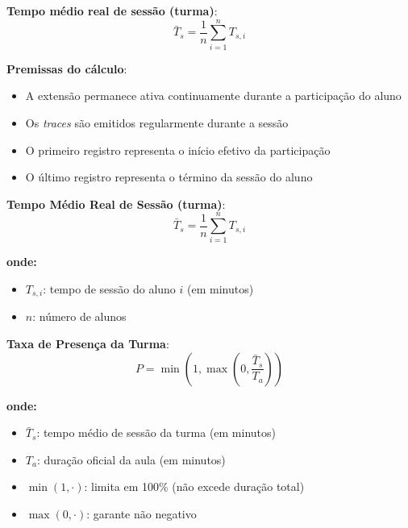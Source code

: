 \textbf{Tempo médio real de sessão (turma)}:
\begin{equation}
\bar{T}_s = \frac{1}{n} \sum_{i=1}^{n} T_{s,i}
\end{equation}

\textbf{Premissas do cálculo}:
\begin{itemize}
    \item A extensão permanece ativa continuamente durante a participação do aluno
    \item Os \textit{traces} são emitidos regularmente durante a sessão
    \item O primeiro registro representa o início efetivo da participação
    \item O último registro representa o término da sessão do aluno
\end{itemize}


\textbf{Tempo Médio Real de Sessão (turma)}:
\begin{equation}
\bar{T}_s = \frac{1}{n} \sum_{i=1}^{n} T_{s,i}
\end{equation}

\textbf{onde:}
\begin{itemize}
    \item $T_{s,i}$: tempo de sessão do aluno $i$ (em minutos)
    \item $n$: número de alunos
\end{itemize}

\textbf{Taxa de Presença da Turma}:
\begin{equation}
P = \min\left(1, \max\left(0, \frac{\bar{T}_s}{T_a}\right)\right)
\end{equation}

\textbf{onde:}
\begin{itemize}
    \item $\bar{T}_s$: tempo médio de sessão da turma (em minutos)
    \item $T_a$: duração oficial da aula (em minutos)
    \item $\min(1, \cdot)$: limita em 100\% (não excede duração total)
    \item $\max(0, \cdot)$: garante não negativo
\end{itemize}


% 


